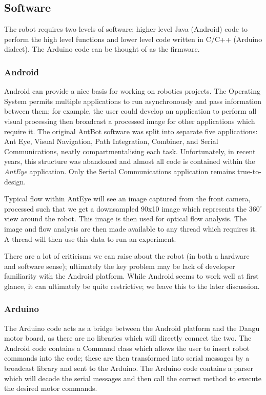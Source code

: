 \documentclass[a4paper,11pt,twoside,openright]{article}
\begin{document}
\subsection{ Software }
The robot requires two levels of software; higher level Java (Android) code to
perform the high level functions and lower level code written in C/C++
(Arduino dialect). The Arduino code can be thought of as the firmware.

\subsubsection{ Android } \label{subsubsec:droid}
Android can provide a nice basis for working on robotics projects. The
Operating System permits multiple applications to run asynchronously and
pass information between them; for example, the user could develop an application
to perform all visual processing then broadcast a processed image for other
applications which require it. The original AntBot software was split into
separate five applications: Ant Eye, Visual Navigation, Path Integration,
Combiner, and Serial Communications, neatly compartmentalising each task.
Unfortunately, in recent years, this structure was abandoned and almost all code
is contained within the \textit{AntEye} application. Only the Serial
Communications application remains true-to-design.
\newline
\par

Typical flow within AntEye will see an image captured from the front camera,
processed such that we get a downsampled 90x10 image which represents the
$360^{\circ}$ view around the robot. This image is then used for optical
flow analysis. The image and flow analysis are then made available to any thread
which requires it. A thread will then use this data to run an experiment.
\newline
\par

There are a lot of criticisms we can raise about the robot (in both a hardware
and software sense); ultimately the key problem may be lack of developer
familiarity with the Android platform.  While Android seems to work well at
first glance, it can ultimately be quite restrictive; we leave this to the
later discussion.

\subsubsection{ Arduino }
The Arduino code acts as a bridge between the Android platform and the Dangu
motor board, as there are no libraries which will directly connect the two.
The Android code contains a Command class which allows the user to insert robot
commands into the code; these are then transformed into serial messages by a
broadcast library \cite{Eberding2016} and sent to the Arduino. The Arduino code
contains a parser which will decode the serial messages and then call the
correct method to execute the desired motor commands.
\end{document}
